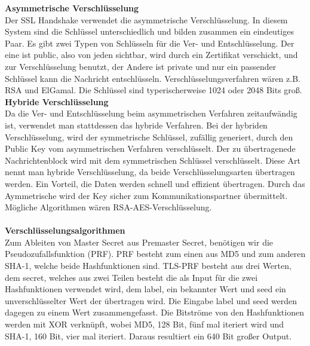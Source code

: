 \documentclass[11pt]{scrartcl}
\begin{document}
\noindent
\textbf{Asymmetrische Verschlüsselung}\\
Der SSL Handshake verwendet die asymmetrische Verschlüsselung. In diesem System sind die Schlüssel unterschiedlich und bilden zusammen ein eindeutiges Paar. Es gibt zwei Typen von Schlüsseln für die Ver- und Entschlüsselung. Der eine ist public, also von jeden sichtbar, wird durch ein Zertifikat verschickt, und zur Verschlüsselung benutzt, der Andere ist private und nur ein passender Schlüssel kann die Nachricht entschlüsseln. Verschlüsselungsverfahren wären z.B. RSA und ElGamal. Die Schlüssel sind typerischerweise 1024 oder 2048 Bits groß. \cite{4}\\



\noindent
\textbf{Hybride Verschlüsselung}\\
Da die Ver- und Entschlüsselung beim asymmetrischen Verfahren zeitaufwändig ist, verwendet man stattdessen das hybride Verfahren. Bei der hybriden Verschlüsselung, wird der symmetrische Schlüssel, zufällig generiert, durch den Public Key vom asymmetrischen Verfahren verschlüsselt. Der zu übertragenede Nachrichtenblock wird mit dem symmetrischen Schlüssel verschlüsselt. Diese Art nennt man hybride Verschlüsselung, da beide Verschlüsselungsarten übertragen werden. Ein Vorteil, die Daten werden schnell und effizient übertragen. Durch das Aymmetrische wird der Key sicher zum Kommunikationspartner übermittelt. Mögliche Algorithmen wären RSA-AES-Verschlüsselung. \cite{3}\\\\
\noindent
\textbf{Verschlüsselungsalgorithmen}\\
Zum Ableiten von Master Secret aus Premaster Secret, benötigen wir die Pseudozufallsfunktion (PRF). PRF besteht zum einen aus MD5 und zum anderen SHA-1, welche beide Hashfunktionen sind. TLS-PRF besteht aus drei Werten, dem secret, welches aus zwei Teilen besteht die als Input für die zwei Hashfunktionen verwendet wird,  dem label, ein bekannter Wert und seed ein unverschlüsselter Wert der übertragen wird. \grqq{}Die Eingabe label und seed werden dagegen zu einem Wert zusammengefasst.\grqq{}\cite{1} Die Bitströme von den Hashfunktionen werden mit XOR verknüpft, wobei MD5, 128 Bit, fünf mal iteriert wird und SHA-1, 160 Bit, vier mal iteriert. Daraus resultiert ein 640 Bit großer Output. \cite{1}
\end{document}
